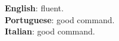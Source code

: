 \documentclass[12pt]{article}
\renewcommand{\section}[1]{\pagebreak[3]%
    \hyphenpenalty=10000%
    \vspace{1.3\baselineskip}%
    \phantomsection\addcontentsline{toc}{section}{#1}%
    \noindent\llap{\scshape\smash{\parbox[t]{\marginparwidth}{\raggedright #1}}}%
    \vspace{-\baselineskip}\par}
\begin{document}
\textbf{English}: fluent.\\

\textbf{Portuguese}: good command.\\

\textbf{Italian}: good command.\\






\end{document}
